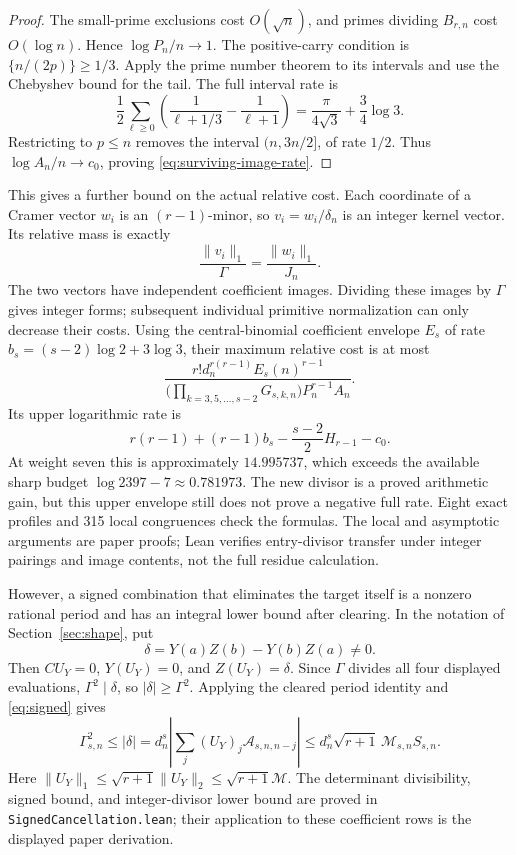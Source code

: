 \documentclass[11pt]{article}
\theoremstyle{remark}
\newcommand{\cA}{\mathcal A}
\newcommand{\cM}{\mathcal M}
\begin{document}
\begin{proof}
The small-prime exclusions cost \(O(\sqrt n)\), and primes dividing
\(B_{r,n}\) cost \(O(\log n)\). Hence \(\log P_n/n\to1\).
The positive-carry condition is
\(\{n/(2p)\}\ge1/3\). Apply the prime number theorem to its
intervals and use the Chebyshev bound for the tail. The full interval
rate is
\[
 \frac12\sum_{\ell\ge0}
 \left(\frac1{\ell+1/3}-\frac1{\ell+1}\right)
 =\frac\pi{4\sqrt3}+\frac34\log3.
\]
Restricting to \(p\le n\) removes the interval \((n,3n/2]\), of
rate \(1/2\). Thus \(\log A_n/n\to c_0\), proving
\eqref{eq:surviving-image-rate}.
\end{proof}

This gives a further bound on the actual relative cost. Each coordinate
of a Cramer vector \(w_i\) is an \((r-1)\)-minor, so
\(v_i=w_i/\delta_n\) is an integer kernel vector. Its relative mass
is exactly
\[
 \frac{\|v_i\|_1}{\Gamma}=\frac{\|w_i\|_1}{J_n}.
\]
The two vectors have independent coefficient images. Dividing these
images by \(\Gamma\) gives integer forms; subsequent individual
primitive normalization can only decrease their costs. Using the
central-binomial coefficient envelope \(E_s\) of rate
\(b_s=(s-2)\log2+3\log3\), their maximum relative cost is at most
\[
 \frac{r!d_n^{r(r-1)}E_s(n)^{r-1}}
 {\bigl(\prod_{k=3,5,\ldots,s-2}G_{s,k,n}\bigr)P_n^{r-1}A_n}.
\]
Its upper logarithmic rate is
\[
 r(r-1)+(r-1)b_s-\frac{s-2}{2}H_{r-1}-c_0.
\]
At weight seven this is approximately \(14.995737\), which exceeds
the available sharp budget \(\log2397-7\approx0.781973\).
The new divisor is a proved arithmetic gain, but this upper envelope
still does not prove a negative full rate. Eight exact profiles and
315 local congruences check the formulas. The local and asymptotic
arguments are paper proofs; Lean verifies entry-divisor transfer under
integer pairings and image contents, not the full residue calculation.

However, a signed combination that eliminates the target itself is a
nonzero rational period and has an integral lower bound after clearing.
In the notation of Section~\ref{sec:shape}, put
\[
 \delta=Y(a)Z(b)-Y(b)Z(a)\ne0.
\]
Then \(C U_Y=0\), \(Y(U_Y)=0\), and \(Z(U_Y)=\delta\).
Since \(\Gamma\) divides all four displayed evaluations,
\(\Gamma^2\mid\delta\), so \(|\delta|\ge\Gamma^2\).
Applying the cleared period identity and \eqref{eq:signed} gives
\begin{equation}
 \boxed{\Gamma_{s,n}^2
  \le |\delta|
  =d_n^s\left|\sum_j(U_Y)_j\cA_{s,n,n-j}\right|
  \le d_n^s\sqrt{r+1}\,\cM_{s,n}S_{s,n}.}
 \label{eq:cofactorlower}
\end{equation}
Here \(\|U_Y\|_1\le\sqrt{r+1}\|U_Y\|_2\le\sqrt{r+1}\cM\).
The determinant divisibility, signed bound, and integer-divisor lower
bound are proved in \texttt{SignedCancellation.lean}; their application
to these coefficient rows is the displayed paper derivation.
\end{document}
